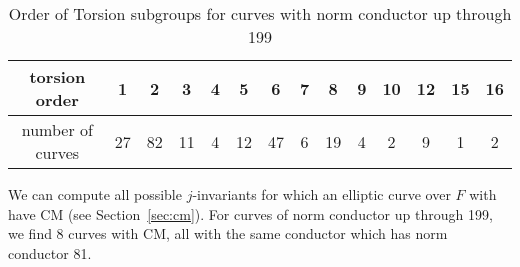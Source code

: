 \documentclass{amsart}
\begin{document}


\begin{center}
\begin{table}[h]
\caption{Order of Torsion subgroups for curves with norm conductor up through 199\label{table:counts}}
\begin{tabular}{|c|c|c|c|c|c|c|c|c|c|c|c|c|c|}\hline
torsion order & 1 & 2 & 3 & 4 & 5 & 6 & 7 & 8 & 9 & 10 & 12 & 15 & 16 \\\hline
number of curves& 27 & 82 & 11 & 4 & 12 & 47 & 6 & 19 & 4 & 2 & 9 & 1 & 2 \\\hline
\end{tabular}
\end{table}
\end{center}



We can compute all possible $j$-invariants for which an elliptic curve
over $F$ with have CM (see Section~\ref{sec:cm}).  For curves of norm
conductor up through 199, we find 8 curves with CM, all with the same
conductor which has norm conductor 81.
\end{document}
